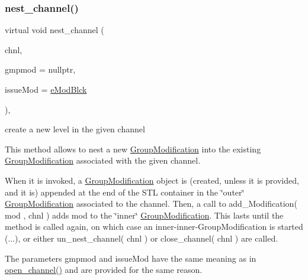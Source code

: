\subsubsection{\texorpdfstring{nest\+\_\+channel()}{nest\_channel()}}
{\footnotesize\ttfamily virtual void nest\+\_\+channel (\begin{DoxyParamCaption}\item[{\mbox{\hyperlink{class_s_m_spp__di__unipi__it_1_1_observer_aa9ad8de42ffaf90023bfed5c085ad8bc}{c\+\_\+\+Chnl\+Name}}}]{chnl,  }\item[{\mbox{\hyperlink{class_s_m_spp__di__unipi__it_1_1_group_modification}{Group\+Modification}} $\ast$}]{gmpmod = {\ttfamily nullptr},  }\item[{\mbox{\hyperlink{group___modification___t_y_p_e_s_ga544246d8c462e9a2d817c2c30797968f}{c\+\_\+\+Mod\+Param}}}]{issue\+Mod = {\ttfamily \mbox{\hyperlink{group___modification___t_y_p_e_s_gga48fddcdd03a03f49b7e389ca1ed938d4a21b14b26b1c0093a0905f6fc010bad29}{e\+Mod\+Blck}}} }\end{DoxyParamCaption})\hspace{0.3cm}{\ttfamily [override]}, {\ttfamily [virtual]}}



create a new level in the given channel 

This method allows to nest a new \mbox{\hyperlink{class_s_m_spp__di__unipi__it_1_1_group_modification}{Group\+Modification}} into the existing \mbox{\hyperlink{class_s_m_spp__di__unipi__it_1_1_group_modification}{Group\+Modification}} associated with the given channel.

When it is invoked, a \mbox{\hyperlink{class_s_m_spp__di__unipi__it_1_1_group_modification}{Group\+Modification}} object is (created, unless it is provided, and it is) appended at the end of the S\+TL container in the \char`\"{}outer\char`\"{} \mbox{\hyperlink{class_s_m_spp__di__unipi__it_1_1_group_modification}{Group\+Modification}} associated to the channel. Then, a call to add\+\_\+\+Modification( mod , chnl ) adds mod to the \char`\"{}inner\char`\"{} \mbox{\hyperlink{class_s_m_spp__di__unipi__it_1_1_group_modification}{Group\+Modification}}. This lasts until the method is called again, on which case an inner-\/inner-\/\+Group\+Modification is started (...), or either un\+\_\+nest\+\_\+channel( chnl ) or close\+\_\+channel( chnl ) are called.

The parameters gmpmod and issue\+Mod have the same meaning as in \mbox{\hyperlink{class_s_m_spp__di__unipi__it_1_1_block_a6459343d63aec3d39ece1e20467db47b}{open\+\_\+channel()}} and are provided for the same reason.

